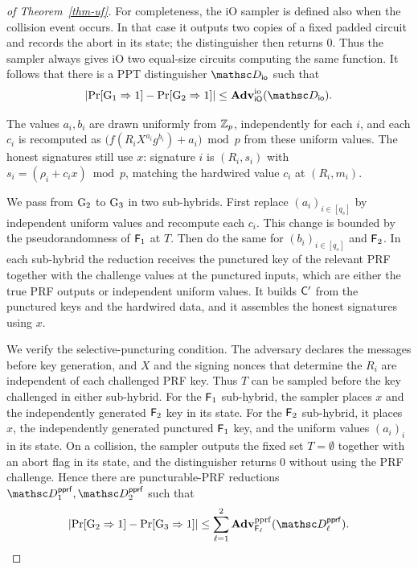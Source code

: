 \begin{proof}[of Theorem~\ref{thm-uf}]
For completeness, the iO sampler is defined also when the collision event occurs. In that case it outputs two copies of a fixed padded circuit and records the abort in its state; the distinguisher then returns 0. Thus the sampler always gives iO two equal-size circuits computing the same function. It follows that there is a PPT distinguisher $\advD_{\mathsf{io}}$ such that
$$
\left|\Pr[\Gm_1\Rightarrow1]-\Pr[\Gm_2\Rightarrow1]\right|
\le \AdvIO{\iO}{\advD_{\mathsf{io}}}.
$$

 The values $a_i,b_i$ are drawn uniformly from $\mathbb Z_p$, independently for each $i$, and each $c_i$ is recomputed as $\big(f(R_iX^{a_i}g^{b_i})+a_i\big)\bmod p$ from these uniform values. The honest signatures still use $x$: signature $i$ is $(R_i,s_i)$ with $s_i=(\rho_i+c_ix)\bmod p$, matching the hardwired value $c_i$ at $(R_i,m_i)$.

We pass from $\textnormal{G}_2$ to $\textnormal{G}_3$ in two sub-hybrids. First replace $(a_i)_{i\in[q_s]}$ by independent uniform values and recompute each $c_i$. This change is bounded by the pseudorandomness of $\mathsf{F}_1$ at $T$. Then do the same for $(b_i)_{i\in[q_s]}$ and $\mathsf{F}_2$. In each sub-hybrid the reduction receives the punctured key of the relevant PRF together with the challenge values at the punctured inputs, which are either the true PRF outputs or independent uniform values. It builds $\mathsf{C}'$ from the punctured keys and the hardwired data, and it assembles the honest signatures using $x$.

We verify the selective-puncturing condition. The adversary declares the messages before key generation, and $X$ and the signing nonces that determine the $R_i$ are independent of each challenged PRF key. Thus $T$ can be sampled before the key challenged in either sub-hybrid. For the $\mathsf{F}_1$ sub-hybrid, the sampler places $x$ and the independently generated $\mathsf{F}_2$ key in its state. For the $\mathsf{F}_2$ sub-hybrid, it places $x$, the independently generated punctured $\mathsf{F}_1$ key, and the uniform values $(a_i)_i$ in its state. On a collision, the sampler outputs the fixed set $T=\emptyset$ together with an abort flag in its state, and the distinguisher returns 0 without using the PRF challenge. Hence there are puncturable-PRF reductions $\advD^{\mathsf{pprf}}_1,\advD^{\mathsf{pprf}}_2$ such that
\begin{align*}
\left|\Pr[\Gm_2 \Rightarrow 1]-\Pr[\Gm_3 \Rightarrow 1]\right|
\le \sum_{\ell=1}^{2}\AdvPPRF{\PRF_\ell}{\advD^{\mathsf{pprf}}_\ell}.
\end{align*}


\end{proof}
